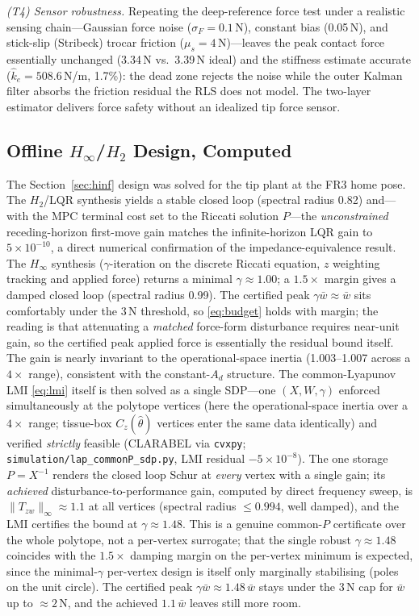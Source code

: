 \emph{(T4) Sensor robustness.} Repeating the deep-reference force test under a realistic sensing chain---Gaussian force noise ($\sigma_F=0.1$\,N), constant bias (0.05\,N), and stick-slip (Stribeck) trocar friction ($\mu_s=4$\,N)---leaves the peak contact force essentially unchanged (3.34\,N vs.\ 3.39\,N ideal) and the stiffness estimate accurate ($\hat k_e=508.6$\,N/m, 1.7\%): the dead zone rejects the noise while the outer Kalman filter absorbs the friction residual the RLS does not model. The two-layer estimator delivers force safety without an idealized tip force sensor.

\subsection{Offline $H_\infty$/$H_2$ Design, Computed}\label{sec:hinfnum}

The Section~\ref{sec:hinf} design was solved for the tip plant at the FR3 home pose. The $H_2$/LQR synthesis yields a stable closed loop (spectral radius 0.82) and---with the MPC terminal cost set to the Riccati solution $P$---the \emph{unconstrained} receding-horizon first-move gain matches the infinite-horizon LQR gain to $5\times10^{-10}$, a direct numerical confirmation of the impedance-equivalence result. The $H_\infty$ synthesis ($\gamma$-iteration on the discrete Riccati equation, $z$ weighting tracking and applied force) returns a minimal $\gamma\approx1.00$; a $1.5\times$ margin gives a damped closed loop (spectral radius 0.99). The certified peak $\gamma\bar w\approx\bar w$ sits comfortably under the 3\,N threshold, so \eqref{eq:budget} holds with margin; the reading is that attenuating a \emph{matched} force-form disturbance requires near-unit gain, so the certified peak applied force is essentially the residual bound itself. The gain is nearly invariant to the operational-space inertia (1.003--1.007 across a $4\times$ range), consistent with the constant-$A_d$ structure. The common-Lyapunov LMI \eqref{eq:lmi} itself is then solved as a single SDP---one $(X,W,\gamma)$ enforced simultaneously at the polytope vertices (here the operational-space inertia over a $4\times$ range; tissue-box $C_z(\hat\theta)$ vertices enter the same data identically) and verified \emph{strictly} feasible (CLARABEL via \texttt{cvxpy}; \texttt{simulation/lap\_commonP\_sdp.py}, LMI residual $-5\times10^{-8}$). The one storage $P=X^{-1}$ renders the closed loop Schur at \emph{every} vertex with a single gain; its \emph{achieved} disturbance-to-performance gain, computed by direct frequency sweep, is $\|T_{zw}\|_\infty\approx1.1$ at all vertices (spectral radius $\le0.994$, well damped), and the LMI certifies the bound at $\gamma\approx1.48$. This is a genuine common-$P$ certificate over the whole polytope, not a per-vertex surrogate; that the single robust $\gamma\approx1.48$ coincides with the $1.5\times$ damping margin on the per-vertex minimum is expected, since the minimal-$\gamma$ per-vertex design is itself only marginally stabilising (poles on the unit circle). The certified peak $\gamma\bar w\approx1.48\,\bar w$ stays under the $3$\,N cap for $\bar w$ up to ${\approx}2$\,N, and the achieved $1.1\,\bar w$ leaves still more room.

